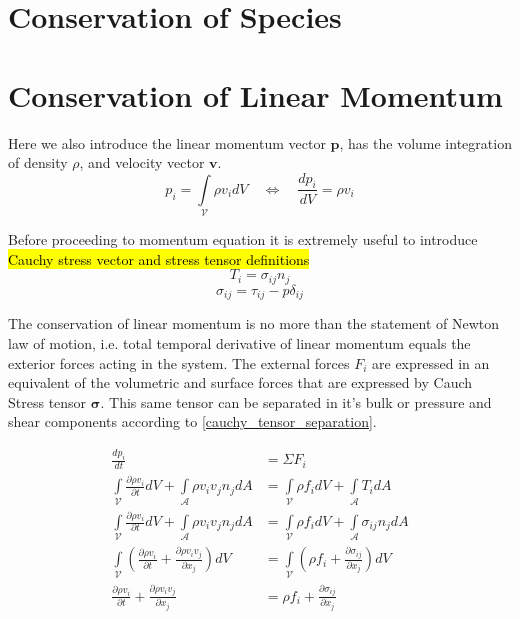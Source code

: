 \section{Conservation of Species}


\section{Conservation of Linear Momentum}
Here we also introduce the linear momentum vector $\boldsymbol{p}$, has the volume
integration of density $\rho$, and velocity vector $\boldsymbol{v}$.
\begin{equation}
p_i=\int\limits_{\mathcal{V}} \rho v_i dV \quad  \Leftrightarrow \quad \frac{dp_i}{dV}= \rho v_i 
\end{equation}

Before proceeding to momentum equation it is extremely useful to introduce
\hl{Cauchy stress vector and stress tensor definitions}
\begin{equation}
    \label{cauchy_stress_vector}
    T_i = \sigma_{ij} n_j
\end{equation}
\begin{equation}
    \label{cauchy_tensor_separation}
    \sigma_{ij} = \tau_{ij} - p \delta_{ij}
\end{equation}

The conservation of linear momentum is no more than the statement of Newton law of motion, i.e. total temporal derivative of linear momentum equals the exterior forces acting in the system. The external forces  $F_i$ are expressed in  an equivalent of the volumetric and surface forces that are expressed by Cauch Stress tensor $\boldsymbol \sigma$. This same tensor can be separated in it's bulk or pressure and shear components according to \eqref{cauchy_tensor_separation}.

\begin{align}
    \frac{dp_i}{dt} &= \Sigma F_i \\
    \int\limits_{\mathcal{V}} \frac{\partial \rho v_i}{\partial t} dV + \int\limits_{\mathcal{A}} \rho v_i v_j n_j dA
    &= \int\limits_{\mathcal{V}} \rho f_i dV + \int\limits_{\mathcal{A}} T_i dA \\
    \int\limits_{\mathcal{V}} \frac{\partial \rho v_i}{\partial t} dV + \int\limits_{\mathcal{A}} \rho v_i v_j n_j dA
    &= \int\limits_{\mathcal{V}} \rho f_i dV + \int\limits_{\mathcal{A}} \sigma_{ij}  n_j dA \\
    \int\limits_{\mathcal{V}} \left( \frac{\partial \rho v_i}{\partial t} + \frac{\partial \rho v_i v_j}{\partial x_j}\right)dV
    &= \int\limits_{\mathcal{V}} \left( \rho f_i  + \frac{\partial \sigma_{ij}}{\partial x_j} \right)dV \\
    \frac{\partial \rho v_i}{\partial t} +  \frac{\partial \rho v_i v_j}{\partial x_j}
    &= \rho f_i + \frac{\partial \sigma_{ij}}{\partial x_j}
\end{align}

